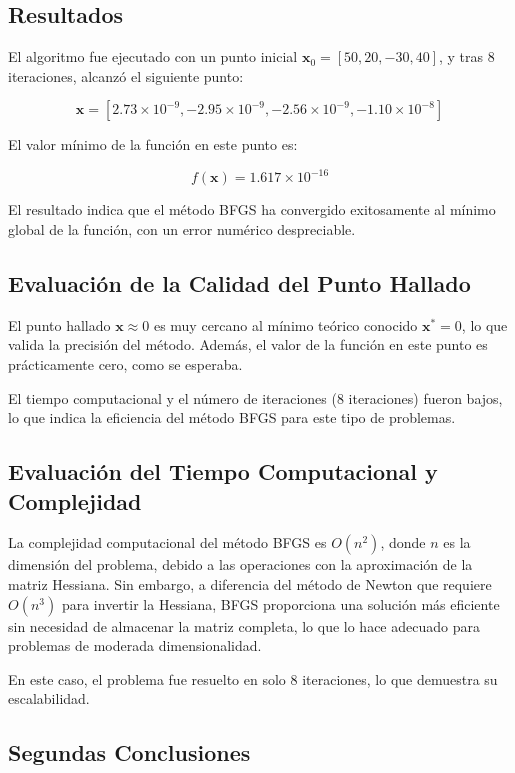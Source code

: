 \documentclass{article}
\begin{document}
	\subsection{Resultados}
	
	El algoritmo fue ejecutado con un punto inicial \(\mathbf{x}_0 = [50, 20, -30, 40]\), y tras 8 iteraciones, alcanzó el siguiente punto:
	
	\[
	\mathbf{x} = [2.73 \times 10^{-9}, -2.95 \times 10^{-9}, -2.56 \times 10^{-9}, -1.10 \times 10^{-8}]
	\]
	
	El valor mínimo de la función en este punto es:
	
	\[
	f(\mathbf{x}) = 1.617 \times 10^{-16}
	\]
	
	El resultado indica que el método BFGS ha convergido exitosamente al mínimo global de la función, con un error numérico despreciable.
	
	
	\subsection{Evaluación de la Calidad del Punto Hallado}
	
	El punto hallado \(\mathbf{x} \approx 0\) es muy cercano al mínimo teórico conocido \(\mathbf{x}^* = 0\), lo que valida la precisión del método. Además, el valor de la función en este punto es prácticamente cero, como se esperaba. 
	
	El tiempo computacional y el número de iteraciones (8 iteraciones) fueron bajos, lo que indica la eficiencia del método BFGS para este tipo de problemas.
	
	\subsection{Evaluación del Tiempo Computacional y Complejidad}
	
	La complejidad computacional del método BFGS es \(O(n^2)\), donde \(n\) es la dimensión del problema, debido a las operaciones con la aproximación de la matriz Hessiana. Sin embargo, a diferencia del método de Newton que requiere \(O(n^3)\) para invertir la Hessiana, BFGS proporciona una solución más eficiente sin necesidad de almacenar la matriz completa, lo que lo hace adecuado para problemas de moderada dimensionalidad.
	
	En este caso, el problema fue resuelto en solo 8 iteraciones, lo que demuestra su escalabilidad.
	
	\subsection{Segundas Conclusiones}
	
\end{document}
